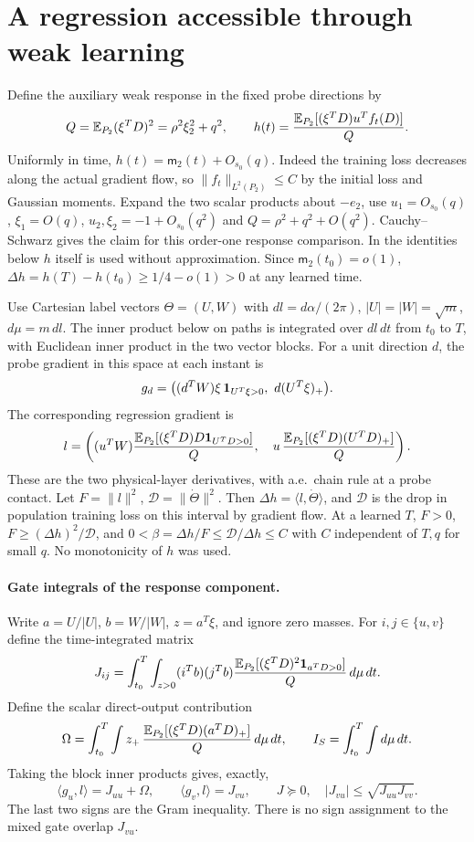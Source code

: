 \documentclass[11pt]{article}
\begin{document}
\section{A regression accessible through weak learning}
Define the auxiliary weak response in the fixed probe directions by
\[
 Q=\mathbb E_{P_2}(\xi^TD)^2=\rho^2\xi_2^2+q^2,\qquad
 h(t)=\frac{\mathbb E_{P_2}[(\xi^TD)u^Tf_t(D)]}{Q}.
\]
Uniformly in time, $h(t)=\mathsf m_2(t)+O_{s_0}(q)$.
Indeed the training loss decreases along the actual gradient flow,
so $\|f_t\|_{L^2(P_2)}\le C$ by the initial loss and Gaussian moments.
Expand the two scalar products about $-e_2$, use $u_1=O_{s_0}(q)$,
$\xi_1=O(q)$, $u_2,\xi_2=-1+O_{s_0}(q^2)$ and
$Q=\rho^2+q^2+O(q^2)$. Cauchy--Schwarz gives the claim for this
order-one response comparison. In the identities below $h$ itself
is used without approximation. Since $\mathsf m_2(t_0)=o(1)$,
$\Delta h=h(T)-h(t_0)\ge1/4-o(1)>0$ at any learned time.

Use Cartesian label vectors $\Theta=(U,W)$ with
$dl=d\alpha/(2\pi)$, $|U|=|W|=\sqrt m$, $d\mu=m\,dl$.
The inner product below on paths is integrated over $dl\,dt$
from $t_0$ to $T$, with Euclidean inner product in the two vector
blocks. For a unit direction $d$, the probe gradient in this space
at each instant is
\[
 g_d=\big((d^TW)\xi\,{\bf1}_{U^T\xi>0},\
                        d(U^T\xi)_+\big).
\]
The corresponding regression gradient is
\[
 l=\left((u^TW)\frac{\mathbb E_{P_2}[(\xi^TD)D{\bf1}_{U^TD>0}]}{Q},
         \quad u\,\frac{\mathbb E_{P_2}[(\xi^TD)(U^TD)_+]}{Q}\right).
\]
These are the two physical-layer derivatives, with a.e.\ chain
rule at a probe contact. Let $F=\|l\|^2$, $\mathcal D=\|\dot\Theta\|^2$.
Then $\Delta h=\langle l,\dot\Theta\rangle$, and $\mathcal D$ is
the drop in population training loss on this interval by gradient
flow. At a learned $T$, $F>0$, $F\ge(\Delta h)^2/\mathcal D$, and
$0<\beta=\Delta h/F\le\mathcal D/\Delta h\le C$ with $C$
independent of $T,q$ for small $q$. No monotonicity of $h$ was used.

\paragraph{Gate integrals of the response component.}
Write $a=U/|U|$, $b=W/|W|$, $z=a^T\xi$, and ignore zero masses.
For $i,j\in\{u,v\}$ define the time-integrated matrix
\[
 J_{ij}=\int_{t_0}^T\int_{z>0}(i^Tb)(j^Tb)
       \frac{\mathbb E_{P_2}[(\xi^TD)^2{\bf1}_{a^TD>0}]}{Q}\,d\mu\,dt .
\]
Define the scalar direct-output contribution
\[
 \Omega=\int_{t_0}^T\int z_+\,
       \frac{\mathbb E_{P_2}[(\xi^TD)(a^TD)_+]}{Q}\,d\mu\,dt,\qquad
 I_S=\int_{t_0}^T\int d\mu\,dt.
\]
Taking the block inner products gives, exactly,
\begin{equation}\label{an04spmv1:measured}
 \langle g_u,l\rangle=J_{uu}+\Omega,\qquad
 \langle g_v,l\rangle=J_{vu},\qquad
 J\succeq0,\quad |J_{vu}|\le\sqrt{J_{uu}J_{vv}} .
\end{equation}
The last two signs are the Gram inequality. There is no sign
assignment to the mixed gate overlap $J_{vu}$.
\end{document}
